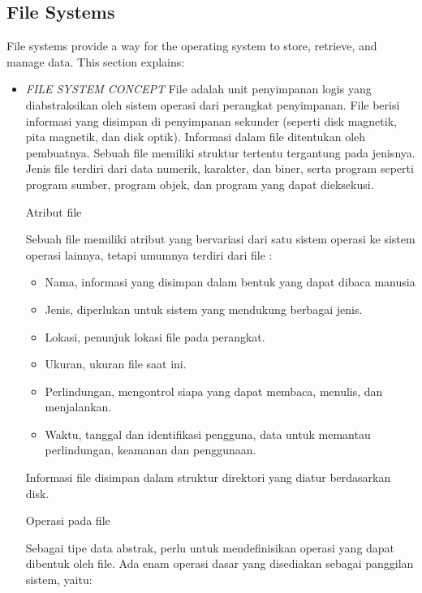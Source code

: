 \documentclass[12pt]{article}
\begin{document}
\subsection{File Systems}
File systems provide a way for the operating system to store, retrieve, and manage data. This section explains:
\begin{itemize}
    \item \textit{FILE SYSTEM CONCEPT}
    File adalah unit penyimpanan logis yang diabstraksikan oleh sistem operasi dari perangkat penyimpanan. File berisi informasi yang disimpan di penyimpanan sekunder (seperti disk magnetik, pita magnetik, dan disk optik). Informasi dalam file ditentukan oleh pembuatnya. Sebuah file memiliki struktur tertentu tergantung pada jenisnya. Jenis file terdiri dari data numerik, karakter, dan biner, serta program seperti program sumber, program objek, dan program yang dapat dieksekusi.
    
    Atribut file 

    Sebuah file memiliki atribut yang bervariasi dari satu sistem operasi ke sistem operasi lainnya, tetapi umumnya terdiri dari file : 

    \begin{itemize}
        
        \item Nama, informasi yang disimpan dalam bentuk yang dapat dibaca manusia  
        
        \item Jenis, diperlukan untuk sistem yang mendukung berbagai jenis. 
        
        \item Lokasi, penunjuk lokasi file pada perangkat. 
        
        \item Ukuran, ukuran file saat ini. 
        
        \item Perlindungan, mengontrol siapa yang dapat membaca, menulis, dan menjalankan. 
        
        \item Waktu, tanggal dan identifikasi pengguna, data untuk memantau perlindungan, keamanan dan penggunaan. 
    \end{itemize}
        Informasi file disimpan dalam struktur direktori yang diatur berdasarkan disk. 
    
        Operasi pada file 
    
             	Sebagai tipe data abstrak, perlu untuk mendefinisikan operasi yang dapat dibentuk oleh file. Ada enam operasi dasar yang disediakan sebagai panggilan sistem, yaitu:
              \begin{itemize}
    

\end{itemize}
\end{itemize}
\end{document}
